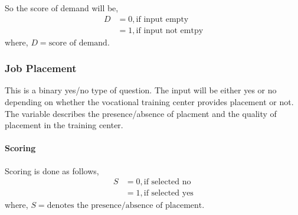 \documentclass[oneside,twocolumn]{article}
\begin{document}
So the score of demand will be,  
\begin{align*} 
	D &= 0, \text{if input empty} \\
          &= 1, \text{if input not emtpy}
\end{align*}
where, \(D = \text{score of demand}\).

\subsubsection{Job Placement}
This is a binary yes/no type of question. The input will be
either yes or no depending on whether the vocational training
center provides placement or not. The variable describes the
presence/absence of placment and the quality of placement in
the training center.
\paragraph{Scoring}
Scoring is done as follows,
\begin{align*}
	S &= 0, \text{if selected no} \\
     	  &= 1, \text{if selected yes}
\end{align*}
where, \(S = \text{denotes the presence/absence of placement}\).
\end{document}
